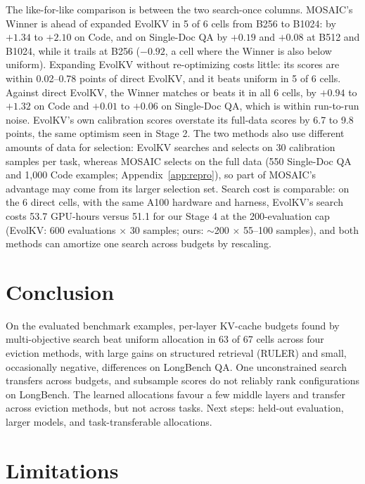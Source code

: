 \documentclass[11pt]{article}
\begin{document}
The like-for-like comparison is between the two search-once columns. MOSAIC's Winner is ahead of expanded EvolKV in 5 of 6 cells from B256 to B1024: by $+1.34$ to $+2.10$ on Code, and on Single-Doc QA by $+0.19$ and $+0.08$ at B512 and B1024, while it trails at B256 ($-0.92$, a cell where the Winner is also below uniform). Expanding EvolKV without re-optimizing costs little: its scores are within 0.02--0.78 points of direct EvolKV, and it beats uniform in 5 of 6 cells. Against direct EvolKV, the Winner matches or beats it in all 6 cells, by $+0.94$ to $+1.32$ on Code and $+0.01$ to $+0.06$ on Single-Doc QA, which is within run-to-run noise. EvolKV's own calibration scores overstate its full-data scores by 6.7 to 9.8 points, the same optimism seen in Stage 2. The two methods also use different amounts of data for selection: EvolKV searches and selects on 30 calibration samples per task, whereas MOSAIC selects on the full data (550 Single-Doc QA and 1{,}000 Code examples; Appendix~\ref{app:repro}), so part of MOSAIC's advantage may come from its larger selection set. Search cost is comparable: on the 6 direct cells, with the same A100 hardware and harness, EvolKV's search costs 53.7 GPU-hours versus 51.1 for our Stage 4 at the 200-evaluation cap (EvolKV: 600 evaluations $\times$ 30 samples; ours: $\sim$200 $\times$ 55--100 samples), and both methods can amortize one search across budgets by rescaling.

\section{Conclusion}

On the evaluated benchmark examples, per-layer KV-cache budgets found by multi-objective search beat uniform allocation in 63 of 67 cells across four eviction methods, with large gains on structured retrieval (RULER) and small, occasionally negative, differences on LongBench QA. One unconstrained search transfers across budgets, and subsample scores do not reliably rank configurations on LongBench. The learned allocations favour a few middle layers and transfer across eviction methods, but not across tasks. Next steps: held-out evaluation, larger models, and task-transferable allocations.

\section*{Limitations}
\end{document}
